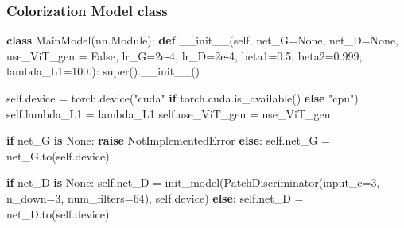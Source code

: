 \documentclass[
]{article}
\newenvironment{Shaded}{}{}
\newcommand{\BuiltInTok}[1]{#1}
\newcommand{\ControlFlowTok}[1]{\textcolor[rgb]{0.00,0.44,0.13}{\textbf{#1}}}
\newcommand{\DecValTok}[1]{\textcolor[rgb]{0.25,0.63,0.44}{#1}}
\newcommand{\FloatTok}[1]{\textcolor[rgb]{0.25,0.63,0.44}{#1}}
\newcommand{\FunctionTok}[1]{\textcolor[rgb]{0.02,0.16,0.49}{#1}}
\newcommand{\KeywordTok}[1]{\textcolor[rgb]{0.00,0.44,0.13}{\textbf{#1}}}
\newcommand{\NormalTok}[1]{#1}
\newcommand{\OperatorTok}[1]{\textcolor[rgb]{0.40,0.40,0.40}{#1}}
\newcommand{\PreprocessorTok}[1]{\textcolor[rgb]{0.74,0.48,0.00}{#1}}
\newcommand{\StringTok}[1]{\textcolor[rgb]{0.25,0.44,0.63}{#1}}
\newcommand{\VariableTok}[1]{\textcolor[rgb]{0.10,0.09,0.49}{#1}}
\begin{document}
\hypertarget{colorization-model-class}{%
\subsubsection{Colorization Model
class}\label{colorization-model-class}}

\begin{Shaded}
\begin{Highlighting}[]
\KeywordTok{class}\NormalTok{ MainModel(nn.Module):}
    \KeywordTok{def} \FunctionTok{\_\_init\_\_}\NormalTok{(}\VariableTok{self}\NormalTok{, net\_G}\OperatorTok{=}\VariableTok{None}\NormalTok{, net\_D}\OperatorTok{=}\VariableTok{None}\NormalTok{, use\_ViT\_gen }\OperatorTok{=} \VariableTok{False}\NormalTok{, lr\_G}\OperatorTok{=}\FloatTok{2e{-}4}\NormalTok{, lr\_D}\OperatorTok{=}\FloatTok{2e{-}4}\NormalTok{, }
\NormalTok{                 beta1}\OperatorTok{=}\FloatTok{0.5}\NormalTok{, beta2}\OperatorTok{=}\FloatTok{0.999}\NormalTok{, lambda\_L1}\OperatorTok{=}\FloatTok{100.}\NormalTok{):}
        \BuiltInTok{super}\NormalTok{().}\FunctionTok{\_\_init\_\_}\NormalTok{()}
        
        \VariableTok{self}\NormalTok{.device }\OperatorTok{=}\NormalTok{ torch.device(}\StringTok{"cuda"} \ControlFlowTok{if}\NormalTok{ torch.cuda.is\_available() }\ControlFlowTok{else} \StringTok{"cpu"}\NormalTok{)}
        \VariableTok{self}\NormalTok{.lambda\_L1 }\OperatorTok{=}\NormalTok{ lambda\_L1}
        \VariableTok{self}\NormalTok{.use\_ViT\_gen }\OperatorTok{=}\NormalTok{ use\_ViT\_gen}
        
        \ControlFlowTok{if}\NormalTok{ net\_G }\KeywordTok{is} \VariableTok{None}\NormalTok{:}
            \ControlFlowTok{raise} \PreprocessorTok{NotImplementedError}
        \ControlFlowTok{else}\NormalTok{:}
            \VariableTok{self}\NormalTok{.net\_G }\OperatorTok{=}\NormalTok{ net\_G.to(}\VariableTok{self}\NormalTok{.device)}
        
        \ControlFlowTok{if}\NormalTok{ net\_D }\KeywordTok{is} \VariableTok{None}\NormalTok{:}
            \VariableTok{self}\NormalTok{.net\_D }\OperatorTok{=}\NormalTok{ init\_model(PatchDiscriminator(input\_c}\OperatorTok{=}\DecValTok{3}\NormalTok{, n\_down}\OperatorTok{=}\DecValTok{3}\NormalTok{, num\_filters}\OperatorTok{=}\DecValTok{64}\NormalTok{), }\VariableTok{self}\NormalTok{.device)}
        \ControlFlowTok{else}\NormalTok{:}
            \VariableTok{self}\NormalTok{.net\_D }\OperatorTok{=}\NormalTok{ net\_D.to(}\VariableTok{self}\NormalTok{.device)}
            

\end{Highlighting}
\end{Shaded}
\end{document}

